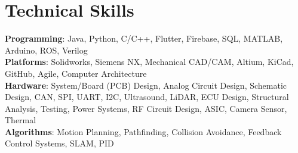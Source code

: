 \documentclass[letterpaper,11pt]{article}
\begin{document}
\section{Technical Skills}
 \begin{itemize}[leftmargin=0.15in, label={}]
    \small{\item{
     \textbf{Programming}{: Java, Python, C/C++, Flutter, Firebase, SQL, MATLAB, Arduino, ROS, Verilog} \\
     \textbf{Platforms}{: Solidworks, Siemens NX, Mechanical CAD/CAM, Altium, KiCad, GitHub, Agile, Computer Architecture} \\
     \textbf{Hardware}{: System/Board (PCB) Design, Analog Circuit Design, Schematic Design, CAN, SPI, UART, I2C, Ultrasound, LiDAR, ECU Design, Structural Analysis, Testing, Power Systems, RF Circuit Design, ASIC, Camera Sensor, Thermal} \\
     \textbf{Algorithms}{: Motion Planning, Pathfinding, Collision Avoidance, Feedback Control Systems, SLAM, PID} \\
    }}
 \end{itemize}


\end{document}
